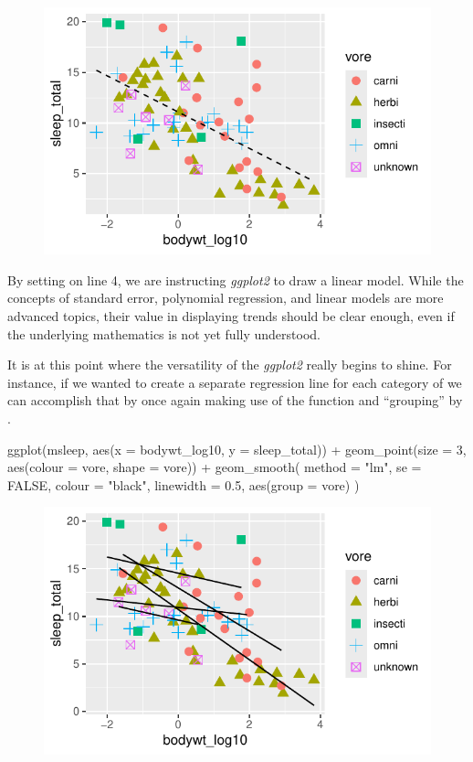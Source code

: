 \vspace{2em}

\begin{figure}[H]
\includegraphics[scale = 0.75]{graphics/ch2Figs/ggEx_11.pdf}
\end{figure}

\noindent By setting  on line 4, we are instructing \textit{ggplot2} to draw a linear model. While the concepts of standard error, polynomial regression, and linear models are more advanced topics, their value in displaying trends should be clear enough, even if the underlying mathematics is not yet fully understood.


It is at this point where the versatility of the \textit{ggplot2} really begins to shine.  For instance, if we wanted to create a separate regression line for each category of  we can accomplish that by once again making use of the  function and ``grouping'' by .

\begin{inR}
ggplot(msleep, aes(x = bodywt_log10, y = sleep_total)) +
  geom_point(size = 3, aes(colour = vore, shape = vore)) +
  geom_smooth(
    method = "lm",
    se = FALSE,
    colour = "black",
    linewidth = 0.5,
    aes(group = vore)
  )
\end{inR}

\vspace{2em}

\begin{figure}[H]
\includegraphics[scale = 0.75]{graphics/ch2Figs/ggEx_12.pdf}
\end{figure}

